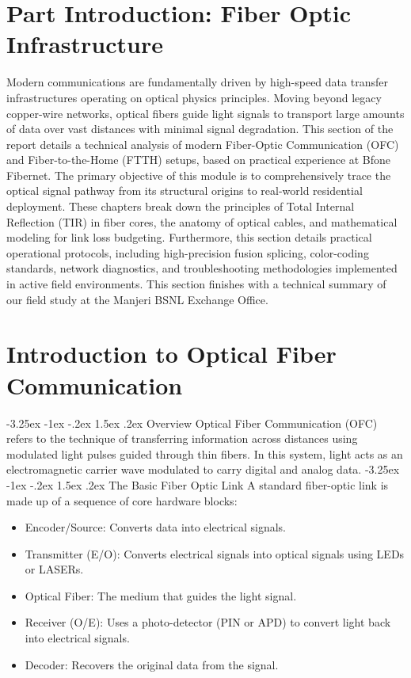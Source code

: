 \documentclass[11pt,a4paper]{report}
\makeatletter
\renewcommand{\section}{\@startsection{section}{1}{\z@}%
  {-3.25ex \@plus -1ex \@minus -.2ex}%
  {1.5ex \@plus.2ex}%
  {\normalfont\Large\bfseries\color{primaryColor}}}
\makeatother
\begin{document}
\chapter*{Part Introduction: Fiber Optic Infrastructure}
Modern communications are fundamentally driven by high-speed data transfer infrastructures operating on optical physics principles. Moving beyond legacy copper-wire networks, optical fibers guide light signals to transport large amounts of data over vast distances with minimal signal degradation. This section of the report details a technical analysis of modern Fiber-Optic Communication (OFC) and Fiber-to-the-Home (FTTH) setups, based on practical experience at Bfone Fibernet. The primary objective of this module is to comprehensively trace the optical signal pathway from its structural origins to real-world residential deployment. These chapters break down the principles of Total Internal Reflection (TIR) in fiber cores, the anatomy of optical cables, and mathematical modeling for link loss budgeting. Furthermore, this section details practical operational protocols, including high-precision fusion splicing, color-coding standards, network diagnostics, and troubleshooting methodologies implemented in active field environments. This section finishes with a technical summary of our field study at the Manjeri BSNL Exchange Office.
\chapter{Introduction to Optical Fiber Communication}
\section{Overview}
Optical Fiber Communication (OFC) refers to the technique of transferring information across distances using modulated light pulses guided through thin fibers. In this system, light acts as an electromagnetic carrier wave modulated to carry digital and analog data.
\section{The Basic Fiber Optic Link}
A standard fiber-optic link is made up of a sequence of core hardware blocks:
\begin{itemize}
  \item Encoder/Source: Converts data into electrical signals.
  \item Transmitter (E/O): Converts electrical signals into optical signals using LEDs or LASERs.
  \item Optical Fiber: The medium that guides the light signal.
  \item Receiver (O/E): Uses a photo-detector (PIN or APD) to convert light back into electrical signals.
  \item Decoder: Recovers the original data from the signal.
\end{itemize}
\end{document}
